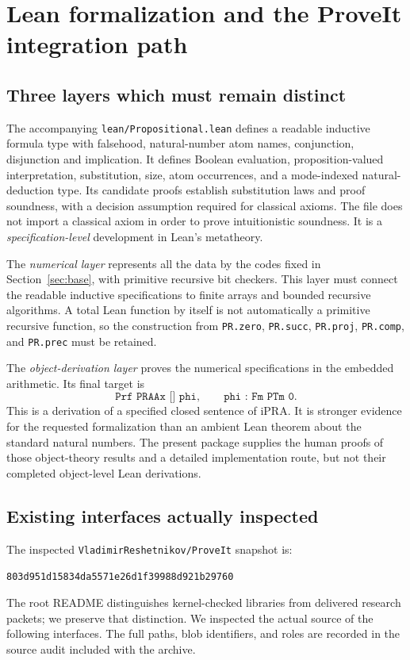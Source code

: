 \section{Lean formalization and the ProveIt integration path}\label{sec:lean}

\subsection{Three layers which must remain distinct}

The accompanying \texttt{lean/Propositional.lean} defines a readable
inductive formula type with falsehood, natural-number atom names, conjunction,
disjunction and implication. It defines Boolean evaluation, proposition-valued
interpretation, substitution, size, atom occurrences, and a mode-indexed
natural-deduction type. Its candidate proofs establish substitution laws and
proof soundness, with a decision assumption required for classical axioms.
The file does not import a classical axiom in order to prove intuitionistic
soundness. It is a \emph{specification-level} development in Lean's metatheory.

The \emph{numerical layer} represents all the data by the codes fixed in
Section~\ref{sec:base}, with primitive recursive bit checkers. This layer
must connect the readable inductive specifications to finite arrays and
bounded recursive algorithms. A total Lean function by itself is not
automatically a primitive recursive function, so the construction from
\texttt{PR.zero}, \texttt{PR.succ}, \texttt{PR.proj}, \texttt{PR.comp}, and
\texttt{PR.prec} must be retained.

The \emph{object-derivation layer} proves the numerical specifications in
the embedded arithmetic. Its final target is
\[
 \texttt{Prf PRAAx [] phi},\qquad \texttt{phi : Fm PTm 0}.
\]
This is a derivation of a specified closed sentence of iPRA. It is stronger
evidence for the requested formalization than an ambient Lean theorem
about the standard natural numbers. The present package supplies the
human proofs of those object-theory results and a detailed implementation
route, but not their completed object-level Lean derivations.

\subsection{Existing interfaces actually inspected}

The inspected \texttt{VladimirReshetnikov/ProveIt} snapshot is:
\begin{center}\texttt{803d951d15834da5571e26d1f39988d921b29760}\end{center}
The root README distinguishes
kernel-checked libraries from delivered research packets; we preserve that
distinction. We inspected the actual source of the following interfaces.
The full paths, blob identifiers, and roles are recorded in the source
audit included with the archive.

